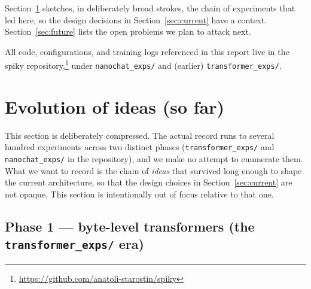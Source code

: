 \documentclass[11pt]{article}
\begin{document}
Section~\ref{sec:evolution} sketches, in deliberately broad strokes, the chain of experiments that led here, so the design decisions in Section~\ref{sec:current} have a context.
Section~\ref{sec:future} lists the open problems we plan to attack next.

All code, configurations, and training logs referenced in this report live in the spiky repository,\footnote{\url{https://github.com/anatoli-starostin/spiky}} under \texttt{nanochat\_exps/} and (earlier) \texttt{transformer\_exps/}.


\section{Evolution of ideas (so far)}
\label{sec:evolution}

This section is deliberately compressed.
The actual record runs to several hundred experiments across two distinct phases (\texttt{transformer\_exps/} and \texttt{nanochat\_exps/} in the repository), and we make no attempt to enumerate them.
What we want to record is the chain of \emph{ideas} that survived long enough to shape the current architecture, so that the design choices in Section~\ref{sec:current} are not opaque.
This section is intentionally out of focus relative to that one.

\subsection{Phase 1 --- byte-level transformers (the \texttt{transformer\_exps/} era)}
\label{sec:evolution:bytelevel}
\end{document}
